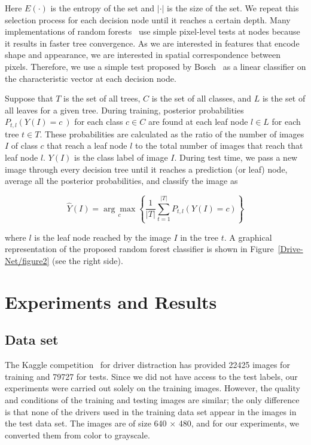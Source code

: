 Here $E(\cdot) $ is the entropy of the set and $\left\vert \cdot\right\vert $ is the size of the set. We repeat this selection process for each decision node until it reaches a certain depth. Many implementations of random forests~\cite{lepetit_Keypoint_2006,winn_Object_2006} use simple pixel-level tests at nodes because it results in faster tree convergence. As we are interested in features that encode shape and appearance, we are interested in spatial correspondence between pixels. Therefore, we use a simple test proposed by Bosch~\cite{bosch_Image_2007} {\textemdash} as a linear classifier on the characteristic vector {\textemdash} at each decision node.

Suppose that $T $ is the set of all trees, $C $ is the set of all classes, and $L $ is the set of all leaves for a given tree. During training, posterior probabilities $P_{t,l}\left(Y\left(I\right)=c\:\right) $ for each class $c\in C $ are found at each leaf node $l\in L $ for each tree $t\in T $. These probabilities are calculated as the ratio of the number of images $I $ of class $c $ that reach a leaf node $l $ to the total number of images that reach that leaf node $l $. $Y\left(I\right) $ is the class label of image $I $. During test time, we pass a new image through every decision tree until it reaches a prediction (or leaf) node, average all the posterior probabilities, and classify the image as


\begin{equation}
\label{disp-formula-group-032e1395024b44bca0feeb46474c0adc}
\widehat Y(I) = \underset c {\arg \max} \left\{\frac{1}{\left\vert T\right\vert}\sum_{t=1}^{\left\vert T\right\vert} P_{t,l} (Y(I) = c) \right\}
\end{equation}


where $l $ is the leaf node reached by the image $I $ in the tree $t $. A graphical representation of the proposed random forest classifier is shown in Figure~\ref{Drive-Net/figure2}  (see the right side).

\section{Experiments and Results}
\subsection{Data set}
The Kaggle competition~\cite{montoya_State_2016} for driver distraction has provided 22425 images for training and 79727 for tests. Since we did not have access to the test labels, our experiments were carried out solely on the training images. However, the quality and conditions of the training and testing images are similar; the only difference is that none of the drivers used in the training data set appear in the images in the test data set. The images are of size 640 \ensuremath{\times} 480, and for our experiments, we converted them from color to grayscale.

